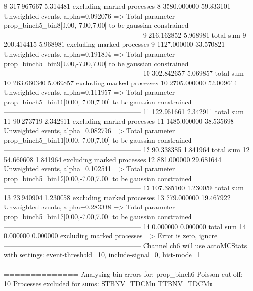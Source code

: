 8          317.967667      5.314481        excluding marked processes    
8          3580.000000     59.833101       Unweighted events, alpha=0.092076
  => Total parameter prop_binch5_bin8[0.00,-7.00,7.00] to be gaussian constrained
------------------------------------------------------------
9          216.162852      5.968981        total sum                     
9          200.414415      5.968981        excluding marked processes    
9          1127.000000     33.570821       Unweighted events, alpha=0.191804
  => Total parameter prop_binch5_bin9[0.00,-7.00,7.00] to be gaussian constrained
------------------------------------------------------------
10         302.842657      5.069857        total sum                     
10         263.660340      5.069857        excluding marked processes    
10         2705.000000     52.009614       Unweighted events, alpha=0.111957
  => Total parameter prop_binch5_bin10[0.00,-7.00,7.00] to be gaussian constrained
------------------------------------------------------------
11         122.951661      2.342911        total sum                     
11         90.273719       2.342911        excluding marked processes    
11         1485.000000     38.535698       Unweighted events, alpha=0.082796
  => Total parameter prop_binch5_bin11[0.00,-7.00,7.00] to be gaussian constrained
------------------------------------------------------------
12         90.338385       1.841964        total sum                     
12         54.660608       1.841964        excluding marked processes    
12         881.000000      29.681644       Unweighted events, alpha=0.102541
  => Total parameter prop_binch5_bin12[0.00,-7.00,7.00] to be gaussian constrained
------------------------------------------------------------
13         107.385160      1.230058        total sum                     
13         23.940904       1.230058        excluding marked processes    
13         379.000000      19.467922       Unweighted events, alpha=0.283338
  => Total parameter prop_binch5_bin13[0.00,-7.00,7.00] to be gaussian constrained
------------------------------------------------------------
14         0.000000        0.000000        total sum                     
14         0.000000        0.000000        excluding marked processes    
  => Error is zero, ignore      
------------------------------------------------------------
Channel ch6 will use autoMCStats with settings: event-threshold=10, include-signal=0, hist-mode=1
============================================================
Analysing bin errors for: prop_binch6
Poisson cut-off: 10
Processes excluded for sums: STBNV_TDCMu TTBNV_TDCMu
